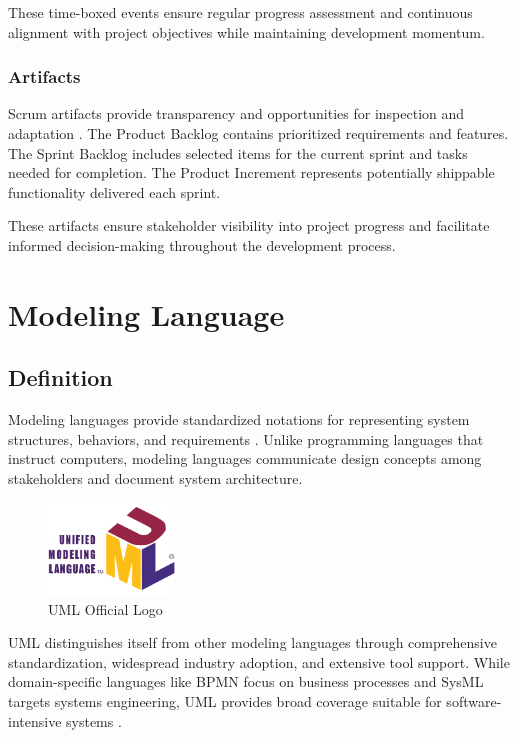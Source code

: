 These time-boxed events ensure regular progress assessment and continuous alignment with project objectives while maintaining development momentum.

\subsubsection{Artifacts}

Scrum artifacts provide transparency and opportunities for inspection and adaptation \cite{scrum_artifacts}. The Product Backlog contains prioritized requirements and features. The Sprint Backlog includes selected items for the current sprint and tasks needed for completion. The Product Increment represents potentially shippable functionality delivered each sprint.

These artifacts ensure stakeholder visibility into project progress and facilitate informed decision-making throughout the development process.

\section{Modeling Language}

\subsection{Definition}

Modeling languages provide standardized notations for representing system structures, behaviors, and requirements \cite{modeling_languages}. Unlike programming languages that instruct computers, modeling languages communicate design concepts among stakeholders and document system architecture.

\begin{figure}[htbp]
\centering
\includegraphics[width=0.3\textwidth]{pictures/web/UML_logo.svg.png}
\caption{UML Official Logo}
\label{fig:uml_logo}
\end{figure}

UML distinguishes itself from other modeling languages through comprehensive standardization, widespread industry adoption, and extensive tool support. While domain-specific languages like BPMN focus on business processes and SysML targets systems engineering, UML provides broad coverage suitable for software-intensive systems \cite{uml_comparison}.

